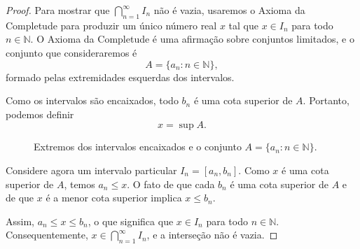 \begin{proof}
Para mostrar que $\bigcap_{n=1}^{\infty}I_n$ não é vazia, usaremos o Axioma da Completude para produzir um único número real $x$ tal que $x\in I_n$ para todo $n\in\mathbb{N}$. O Axioma da Completude é uma afirmação sobre conjuntos limitados, e o conjunto que consideraremos é
\[
A=\{a_n:n\in\mathbb{N}\},
\]
formado pelas extremidades esquerdas dos intervalos.

Como os intervalos são encaixados, todo $b_n$ é uma cota superior de $A$. Portanto, podemos definir
\[
x=\sup A.
\]
\begin{figure}[htbp]
  \centering
  \caption{Extremos dos intervalos encaixados e o conjunto
    $A=\{a_n:n\in\mathbb{N}\}$.}
  \label{fig:intervalos-encaixados}
\end{figure}

Considere agora um intervalo particular $I_n=[a_n,b_n]$. Como $x$ é uma cota superior de $A$, temos $a_n\leq x$. O fato de que cada $b_n$ é uma cota superior de $A$ e de que $x$ é a menor cota superior implica $x\leq b_n$.

Assim, $a_n\leq x\leq b_n$, o que significa que $x\in I_n$ para todo $n\in\mathbb{N}$. Consequentemente, $x\in\bigcap_{n=1}^{\infty}I_n$, e a interseção não é vazia.
\end{proof}

